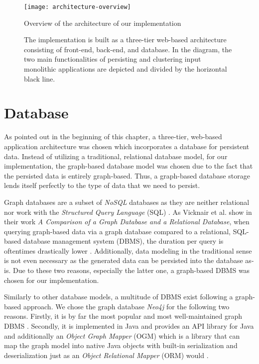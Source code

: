 \documentclass[12pt,a4paper]{report}
\begin{document}
\begin{figure}[htbp]
\centering
\texttt{[image: architecture-overview]}
\caption{Overview of the architecture of our implementation}
\caption*{\centering
    The implementation is built as a three-tier web-based architecture consisting of
    front-end, back-end, and database. In the diagram, the two main functionalities of
    persisting and clustering input monolithic applications are depicted and
    divided by the horizontal black line.
}
\label{fig:architecture-overview}
\end{figure}



\section{Database} \label{sect:implementation-database}

As pointed out in the beginning of this chapter, a three-tier, web-based
application architecture was chosen which incorporates a database
for persistent data.
Instead of utilizing a traditional, relational database model,
for our implementation, the graph-based database model was chosen
due to the fact that the persisted data is entirely graph-based.
Thus, a graph-based database storage lends itself perfectly to the
type of data that we need to persist.

Graph databases are a subset of \textit{NoSQL} databases as they are
neither relational nor work with the \textit{Structured Query Language} (SQL)
\cite{vicknair2010graphdatabase}.
As Vicknair et al. show in their work \textit{A Comparison of a
Graph Database and a Relational Database}, when querying graph-based
data via a graph database compared to a relational, SQL-based
database management system (DBMS), the duration per query is oftentimes
drastically lower \cite{vicknair2010graphdatabase}.
Additionally, data modeling in the traditional sense is not even
necessary as the generated data can be persisted into the database as-is.
Due to these two reasons, especially the latter one, a graph-based DBMS
was chosen for our implementation.

Similarly to other database models, a multitude of DBMS exist following a
graph-based approach.
We chose the graph database \textit{Neo4j} for the following two reasons.
Firstly, it is by far the most popular and most well-maintained graph DBMS
\cite{graph-dbms-ranking}.
Secondly, it is implemented in Java and provides an API library for Java
and additionally an \textit{Object Graph Mapper} (OGM) which is a library
that can map the graph model into native Java objects with built-in
serialization and deserialization just as an \textit{Object Relational Mapper} (ORM)
would \cite{neo4j-ogm}.
\end{document}
